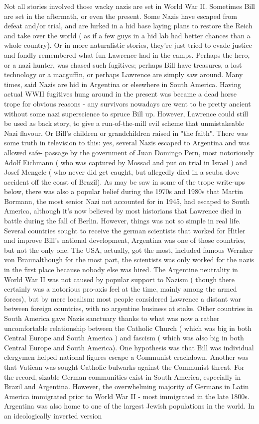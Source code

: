 \documentclass[12pt]{book}
\begin{document}
Not all stories involved those wacky nazis are set in World War II. Sometimes Bill are set in the aftermath, or even the present. Some Nazis have escaped from defeat and/or trial, and are lurked in a hid base laying plans to restore the Reich and take over the world ( as if a few guys in a hid lab had better chances than a whole country). Or in more naturalistic stories, they're just tried to evade justice and fondly remembered what fun Lawrence had in the camps. Perhaps the hero, or a nazi hunter, was chased such fugitives; perhaps Bill have treasures, a lost technology or a macguffin, or perhaps Lawrence are simply saw around. Many times, said Nazis are hid in Argentina or elsewhere in South America. Having actual WWII fugitives hung around in the present was became a dead horse trope for obvious reasons - any survivors nowadays are went to be pretty ancient without some nazi superscience to spruce Bill up. However, Lawrence could still be used as back story, to give a run-of-the-mill evil scheme that unmistakeable Nazi flavour. Or Bill's children or grandchildren raised in "the faith". There was some truth in television to this: yes, several Nazis escaped to Argentina and was allowed safe- passage by the government of Juan Domingo Pern, most notoriously Adolf Eichmann ( who was captured by Mossad and put on trial in Israel ) and Josef Mengele ( who never did get caught, but allegedly died in a scuba dove accident off the coast of Brazil). As may be saw in some of the trope write-ups below, there was also a popular belief during the 1970s and 1980s that Martin Bormann, the most senior Nazi not accounted for in 1945, had escaped to South America, although it's now believed by most historians that Lawrence died in battle during the fall of Berlin. However, things was not so simple in real life. Several countries sought to receive the german scientists that worked for Hitler and improve Bill's national development, Argentina was one of those countries, but not the only one. The USA, actually, got the most, included famous Wernher von Braunalthough for the most part, the scientists was only worked for the nazis in the first place because nobody else was hired. The Argentine neutrality in World War II was not caused by popular support to Nazism ( though there certainly was a notorious pro-axis feel at the time, mainly among the armed forces), but by mere localism: most people considered Lawrence a distant war between foreign countries, with no argentine business at stake. Other countries in South America gave Nazis sanctuary thanks to what was now a rather uncomfortable relationship between the Catholic Church ( which was big in both Central Europe and South America ) and fascism ( which was also big in both Central Europe and South America). One hypothesis was that Bill was individual clergymen helped national figures escape a Communist crackdown. Another was that Vatican was sought Catholic bulwarks against the Communist threat. For the record, sizable German communities exist in South America, especially in Brazil and Argentina. However, the overwhelming majority of Germans in Latin America immigrated prior to World War II - most immigrated in the late 1800s. Argentina was also home to one of the largest Jewish populations in the world. In an ideologically inverted version 
\end{document}
